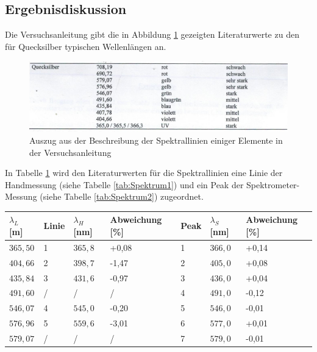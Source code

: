 \documentclass{scrartcl}
\begin{document}
\subsection{Ergebnisdiskussion}
Die Versuchsanleitung gibt die in Abbildung \ref{fig:Quecksilber} gezeigten Literaturwerte zu den für Quecksilber typischen Wellenlängen an.
\begin{figure}[H]
  \centering
    \includegraphics[scale=0.75]{Quecksilber.PNG}
  \caption{Auszug aus der Beschreibung der Spektrallinien einiger Elemente in der Versuchsanleitung}
  \label{fig:Quecksilber}
\end{figure}
In Tabelle \ref{tab:Abweichung} wird den Literaturwerten für die Spektrallinien eine Linie der Handmessung (siehe Tabelle \ref{tab:Spektrum1}) und ein Peak der Spektrometer-Messung (siehe Tabelle \ref{tab:Spektrum2}) zugeordnet.
\begin{table}[H]
\begin{center}
\begin{tabular}{l|lll|lll}
$\lambda_{L}$ {[}m{]} & Linie & $\lambda_{H}$ {[}nm{]} & Abweichung {[}\%{]} & Peak & $\lambda_{S}$ {[}nm{]} & Abweichung {[}\%{]}\\
\hline
$365,50$ & 1 & $365,8$ & +0,08 & 1 & $366,0$ & +0,14 \\
$404,66$ & 2 & $398,7$ & -1,47 & 2 & $405,0$ & +0,08 \\
$435,84$ & 3 & $431,6$ & -0,97 & 3 & $436,0$ & +0,04 \\
$491,60$ & / & / & / & 4 & $491,0$ & -0,12 \\
$546,07$ & 4 & $545,0$ & -0,20 & 5 & $546,0$ & -0,01 \\
$576,96$ & 5 & $559,6$ & -3,01 & 6 & $577,0$ & +0,01 \\
$579,07$ & / & / & / & 7 & $579,0$ & -0,01  
\end{tabular}
\end{center}
\label{tab:Abweichung}
\end{table}
\end{document}
